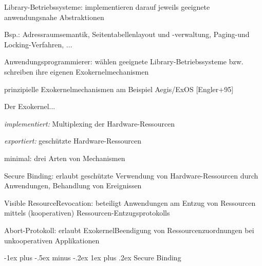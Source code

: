 \documentclass[a4paper]{article}
\makeatletter
\renewcommand{\subsubsection}{\@startsection{subsubsection}{3}{0mm}%
 {-1ex plus -.5ex minus -.2ex}%
 {1ex plus .2ex}%
 {\normalfont\small\bfseries}}
\makeatother
\begin{document}
\begin{multicols}{3}
\begin{itemize*}
\begin{itemize*}
            \item Library-Betriebssysteme: implementieren darauf jeweils geeignete anwendungsnahe Abstraktionen \begin{itemize*} \item   Bsp.: Adressraumsemantik, Seitentabellenlayout und -verwaltung,   Paging-und Locking-Verfahren, ... \end{itemize*}
            \item Anwendungsprogrammierer: wählen geeignete Library-Betriebssysteme bzw. schreiben ihre eigenen Exokernelmechanismen
        \end{itemize*}
        \item
        prinzipielle Exokernelmechanismen am Beispiel Aegis/ExOS
        {[}Engler+95{]}
        \begin{itemize*}
            \item Der Exokernel... \begin{itemize*} \item   \emph{implementiert:} Multiplexing der Hardware-Ressourcen \item   \emph{exportiert:} geschützte Hardware-Ressourcen \end{itemize*}
        \end{itemize*}
        \item
        minimal: drei Arten von Mechanismen
        \begin{enumerate*}

            \item Secure Binding: erlaubt geschützte Verwendung von Hardware-Ressourcen durch Anwendungen, Behandlung von Ereignissen
            \item Visible ResourceRevocation: beteiligt Anwendungen am Entzug von Ressourcen mittels (kooperativen) Ressourcen-Entzugsprotokolls
            \item Abort-Protokoll: erlaubt ExokernelBeendigung von Ressourcenzuordnungen bei unkooperativen Applikationen
        \end{enumerate*}
    \end{itemize*}


    \subsubsection{Secure Binding}


\end{multicols}
\end{document}

